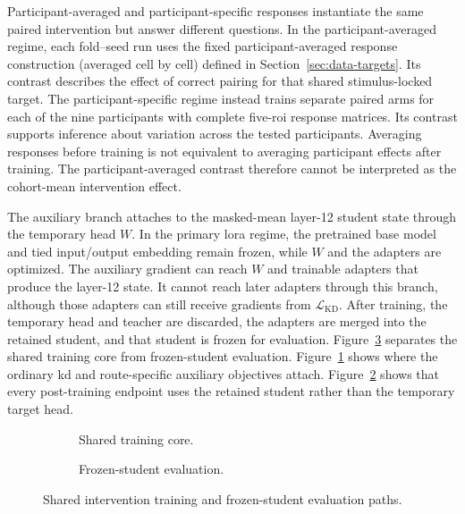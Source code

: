 Participant-averaged and participant-specific responses instantiate the same paired intervention but answer different questions.
In the participant-averaged regime, each fold--seed run uses the fixed participant-averaged response construction (averaged cell by cell) defined in Section~\ref{sec:data-targets}.
Its contrast describes the effect of correct pairing for that shared stimulus-locked target.
The participant-specific regime instead trains separate paired arms for each of the nine participants with complete five-\ac{roi} response matrices.
Its contrast supports inference about variation across the tested participants.
Averaging responses before training is not equivalent to averaging participant effects after training.
The participant-averaged contrast therefore cannot be interpreted as the cohort-mean intervention effect.

The auxiliary branch attaches to the masked-mean layer-12 student state through the temporary head \(W\).
In the primary \ac{lora} regime, the pretrained base model and tied input/output embedding remain frozen, while \(W\) and the adapters are optimized.
The auxiliary gradient can reach \(W\) and trainable adapters that produce the layer-12 state.
It cannot reach later adapters through this branch, although those adapters can still receive gradients from \(\mathcal L_{\mathrm{KD}}\).
After training, the temporary head and teacher are discarded, the adapters are merged into the retained student, and that student is frozen for evaluation.
Figure~\ref{fig:training-architecture} separates the shared training core from frozen-student evaluation.
Figure~\ref{fig:training-architecture-training} shows where the ordinary \ac{kd} and route-specific auxiliary objectives attach.
Figure~\ref{fig:training-architecture-evaluation} shows that every post-training endpoint uses the retained student rather than the temporary target head.

\begin{figure}[H]
  \centering
  \begin{subfigure}{\textwidth}
    \centering
    \resizebox{\linewidth}{!}{}
    \caption{Shared training core.}
    \label{fig:training-architecture-training}
  \end{subfigure}

  \vspace{2mm}

  \begin{subfigure}{\textwidth}
    \centering
    \resizebox{\linewidth}{!}{}
    \caption{Frozen-student evaluation.}
    \label{fig:training-architecture-evaluation}
  \end{subfigure}
  \caption{Shared intervention training and frozen-student evaluation paths.}
  \label{fig:training-architecture}
\end{figure}
\FloatBarrier

